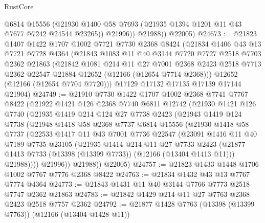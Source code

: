 \begin{lexlean}{RustCore}
\begin{coremodule}
              @6814
              @15556
              (@21930 @1400 @58 @7693 (@21935 @1394 @1201 @11 @43 @7677 @7242 @24544 @23265))
              @21996))
          @21988))
      @22005)
@24673 := @21823
    @1407
    @1422
    @1707
    @1002
    @7721
    @7730
    @2368
    @8424
    (@21834
      @1406
      @43
      @13
      @7721
      @7728
      @4364
      (@21843
        @1083
        @11
        @40
        @3144
        @7720
        @7727
        @2518
        @7703
        @2362
        @21863
        (@21842
          @1081
          @214
          @11
          @27
          @7001
          @2368
          @2423
          @2518
          @7713
          @2362
          @22547
          @21884
          @12652
          (@12166 (@12654 @7714 @2368)))
        @12652
        (@12166 (@12654 @7704 @7720)))
      @17129
      @17132
      @17135
      @17139
      @17144
      @21904)
@24749 := @21910
    @7730
    @1422
    @1707
    @1002
    @2368
    @7741
    @7767
    @8422
    (@21922
      @1421
      @126
      @2368
      @7740
      @6811
      @12742
      (@21930
        @1421
        @126
        @7740
        (@21935
          @1419
          @214
          @124
          @27
          @7738
          @2423
          (@21943
            @1419
            @124
            @7738
            (@21948
              @1418
              @58
              @2368
              @7737
              @6814
              @15556
              (@21930
                @1418
                @58
                @7737
                (@22533
                  @1417
                  @11
                  @43
                  @7001
                  @7736
                  @22547
                  (@23091
                    @1416
                    @11
                    @40
                    @7189
                    @7735
                    @23105
                    (@21935
                      @1414
                      @214
                      @11
                      @27
                      @7733
                      @2423
                      (@21877 @1413 @7733 (@13398 (@13399 @7733)) (@12166 (@13404 @1413 @11)))
                      @21988))))
              @21996))
          @21988))
      @22005)
@24757 := @21823 @1433 @1448 @1706 @1002 @7767 @7776 @2368 @8422
@24763 := @21834 @1432 @43 @13 @7767 @7774 @4364
@24773 := @21843 @1431 @11 @40 @3144 @7766 @7773 @2518 @7747 @2362 @21863
@24783 := @21842 @1429 @214 @11 @27 @7763 @2368 @2423 @2518 @7757 @2362
@24792 := @21877 @1428 @7763 (@13398 (@13399 @7763)) (@12166 (@13404 @1428 @11))

\end{coremodule}
\end{lexlean}
